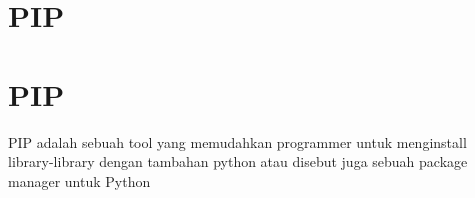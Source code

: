 
\section{PIP}

    \section{PIP}
	PIP adalah sebuah tool yang memudahkan programmer untuk menginstall library-library  dengan tambahan python atau disebut juga sebuah package manager untuk Python